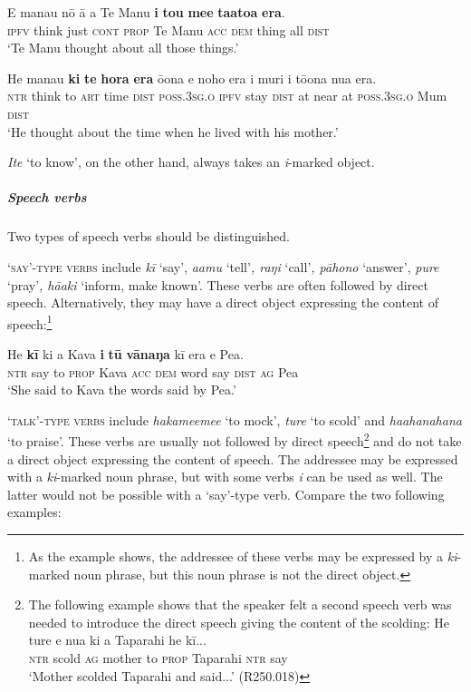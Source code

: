 \ea\label{ex:8.120}
\gll E mana{\ꞌ}u nō {\ꞌ}ā a Te Manu \textbf{i} \textbf{tou} \textbf{me{\ꞌ}e} \textbf{ta{\ꞌ}ato{\ꞌ}a} \textbf{era}. \\
\textsc{ipfv} think just \textsc{cont} \textsc{prop} Te Manu \textsc{acc} \textsc{dem} thing all \textsc{dist} \\

\glt 
‘Te Manu thought about all those things.’ \textstyleExampleref{[R245.011]} 
\z

\ea\label{ex:8.121}
\gll He mana{\ꞌ}u \textbf{ki} \textbf{te} \textbf{hora} \textbf{era} ō{\ꞌ}ona e noho era  {\ꞌ}i muri i tō{\ꞌ}ona nua era.\\
\textsc{ntr} think to \textsc{art} time \textsc{dist} \textsc{poss.3sg.o} \textsc{ipfv} stay \textsc{dist}  at near at \textsc{poss.3sg.o} Mum \textsc{dist}\\

\glt
‘He thought about the time when he lived with his mother.’ \textstyleExampleref{[R245.003]} 
\z

\textit{{\ꞌ}Ite} ‘to know’, on the other hand, always takes an \textit{i}{}-marked object.

\subparagraph{Speech verbs} Two types of speech verbs should be distinguished. 

\textsc{‘}\textsc{say’-type verbs} include \textit{kī} ‘say’, \textit{{\ꞌ}a{\ꞌ}amu} ‘tell’\textit{, raŋi} ‘call’\textit{, pāhono} ‘answer’, \textit{pure} ‘pray’\textit{, hā{\ꞌ}aki} ‘inform, make known’. These verbs are often followed by direct speech. Alternatively, they may have a direct object expressing the content of speech:\footnote{\label{fn:436}As the example shows, the addressee of these verbs may be expressed by a \textit{ki}{}-marked noun phrase, but this noun phrase is not the direct object.} 

\ea\label{ex:8.122}
\gll He \textbf{kī} ki a Kava \textbf{i} \textbf{tū} \textbf{vānaŋa} kī era e Pea. \\
\textsc{ntr} say to \textsc{prop} Kava \textsc{acc} \textsc{dem} word say \textsc{dist} \textsc{ag} Pea \\

\glt
‘She said to Kava the words said by Pea.’ \textstyleExampleref{[R229.075]} 
\z

\textsc{‘}\textsc{talk’-type verbs} include \textit{hakame{\ꞌ}eme{\ꞌ}e} ‘to mock’, \textit{ture} ‘to scold’ and \textit{ha{\ꞌ}a\-hana\-hana} ‘to praise’. These verbs are usually not followed by direct speech\footnote{\label{fn:437}The following example shows that the speaker felt a second speech verb was needed to introduce the direct speech giving the content of the scolding:
\ea
\gll 
He ture e nua ki a Taparahi he kī...\\
  \textsc{ntr} scold \textsc{ag} mother to \textsc{prop} Taparahi \textsc{ntr} say \\
  \glt  
  ‘Mother scolded Taparahi and said...’ (R250.018)
  \z } and do not take a direct object expressing the content of speech. The addressee may be expressed with a \textit{ki}{}-marked noun phrase, but with some verbs \textit{i} can be used as well. The latter would not be possible with a ‘say’-type verb. Compare the two following examples:


